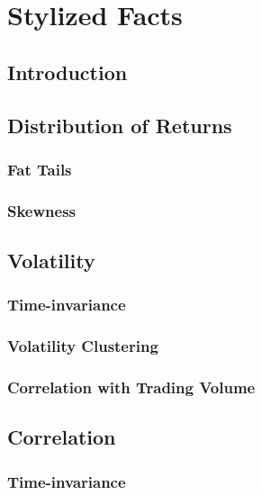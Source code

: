 \documentclass[]{book}
\theoremstyle{definition}
\theoremstyle{definition}
\theoremstyle{definition}
\theoremstyle{remark}
\begin{document}
\chapter{Stylized Facts}\label{stylized-facts}

\section{Introduction}\label{introduction}

\section{Distribution of Returns}\label{distribution-of-returns}

\subsection{Fat Tails}\label{fat-tails}

\subsection{Skewness}\label{skewness}

\section{Volatility}\label{volatility}

\subsection{Time-invariance}\label{time-invariance}

\subsection{Volatility Clustering}\label{volatility-clustering}

\subsection{Correlation with Trading
Volume}\label{correlation-with-trading-volume}

\section{Correlation}\label{correlation}

\subsection{Time-invariance}\label{time-invariance-1}
\end{document}
